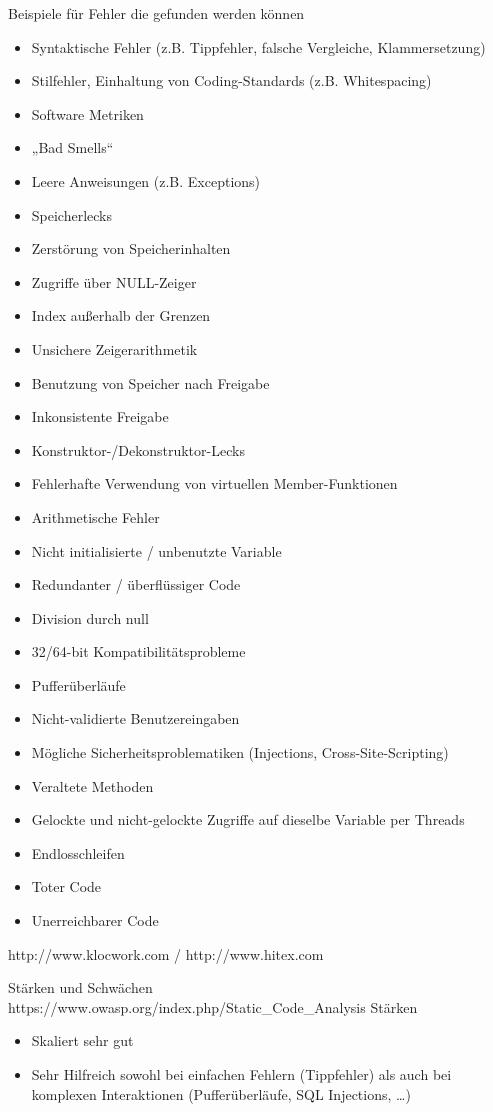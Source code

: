 Beispiele für Fehler die gefunden werden können
\begin{itemize}
\item Syntaktische Fehler (z.B. Tippfehler, falsche Vergleiche, Klammersetzung)
\item Stilfehler, Einhaltung von Coding-Standards (z.B. Whitespacing)
\item Software Metriken 
\item „Bad Smells“
\item Leere Anweisungen (z.B. Exceptions)
\item Speicherlecks
\item Zerstörung von Speicherinhalten
\item Zugriffe über NULL-Zeiger
\item Index außerhalb der Grenzen
\item Unsichere Zeigerarithmetik
\item Benutzung von Speicher nach Freigabe
\item Inkonsistente Freigabe
\item Konstruktor-/Dekonstruktor-Lecks
\item Fehlerhafte Verwendung von virtuellen Member-Funktionen
\item Arithmetische Fehler
\item Nicht initialisierte / unbenutzte Variable
\item Redundanter / überflüssiger Code
\item Division durch null
\item 32/64-bit Kompatibilitätsprobleme
\item Pufferüberläufe
\item Nicht-validierte Benutzereingaben
\item Mögliche Sicherheitsproblematiken (Injections, Cross-Site-Scripting)
\item Veraltete Methoden
\item Gelockte und nicht-gelockte Zugriffe auf dieselbe Variable per Threads
\item Endlosschleifen
\item Toter Code
\item Unerreichbarer Code
\end{itemize}
http://www.klocwork.com / http://www.hitex.com 

Stärken und Schwächen https://www.owasp.org/index.php/Static_Code_Analysis
Stärken
\begin{itemize}
\item Skaliert sehr gut
\item Sehr Hilfreich sowohl bei einfachen Fehlern (Tippfehler) als auch bei komplexen Interaktionen (Pufferüberläufe, SQL Injections, …)
\end{itemize}

